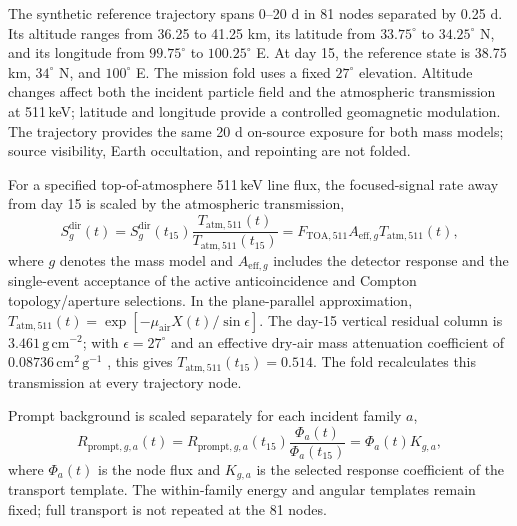 \documentclass[11pt]{article}
\begin{document}
The synthetic reference trajectory spans 0--20 d in 81 nodes separated by
0.25 d. Its altitude ranges from 36.25 to 41.25 km, its latitude from
$33.75^\circ$ to $34.25^\circ$ N, and its longitude from $99.75^\circ$ to
$100.25^\circ$ E. At day 15, the reference state is 38.75 km,
$34^\circ$ N, and $100^\circ$ E. The mission fold uses a fixed
$27^\circ$ elevation. Altitude changes affect both the incident
particle field and the atmospheric transmission at 511\,keV; latitude and
longitude provide a controlled geomagnetic modulation. The trajectory provides
the same 20 d on-source exposure for both mass models; source visibility,
Earth occultation, and repointing are not folded.

For a specified top-of-atmosphere 511\,keV line flux, the focused-signal rate
away from day 15 is scaled by the atmospheric transmission,
\begin{equation}
 S^{\mathrm{dir}}_g(t)
 =S^{\mathrm{dir}}_g(t_{15})
 \frac{T_{\mathrm{atm},511}(t)}{T_{\mathrm{atm},511}(t_{15})}
 =F_{\mathrm{TOA},511}A_{\mathrm{eff},g}T_{\mathrm{atm},511}(t),
 \label{eq:mission_signal}
\end{equation}
where $g$ denotes the mass model and $A_{\mathrm{eff},g}$ includes the detector
response and the single-event acceptance of the active anticoincidence and
Compton topology/aperture selections. In the plane-parallel approximation,
$T_{\mathrm{atm},511}(t)=\exp[-\mu_{\mathrm{air}}X(t)/\sin\epsilon]$. The
day-15 vertical residual column is $3.461\,\mathrm{g\,cm^{-2}}$; with
$\epsilon=27^\circ$ and an effective dry-air mass attenuation coefficient of
$0.08736\,\mathrm{cm^2\,g^{-1}}$ \cite{NISTXCOM}, this gives
$T_{\mathrm{atm},511}(t_{15})=0.514$. The fold recalculates this transmission
at every trajectory node.

Prompt background is scaled separately for each incident family $a$,
\begin{equation}
 R_{\mathrm{prompt},g,a}(t)
 =R_{\mathrm{prompt},g,a}(t_{15})
 \frac{\Phi_a(t)}{\Phi_a(t_{15})}
 =\Phi_a(t)K_{g,a},
 \label{eq:prompt_source_response}
\end{equation}
where $\Phi_a(t)$ is the node flux and $K_{g,a}$ is the selected response
coefficient of the transport template. The within-family energy and angular
templates remain fixed; full transport is not repeated at the 81 nodes.
\end{document}
